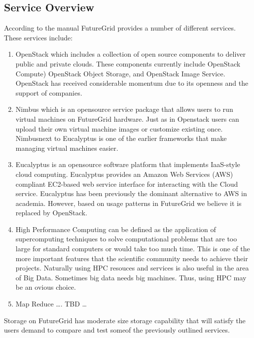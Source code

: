 
\subsection{Service Overview}

According to the manual FutureGrid provides a number of different
services. These services include:

\begin{enumerate}
\item OpenStack which includes a collection of open source components to deliver public and private clouds. These components currently include OpenStack Compute) OpenStack Object Storage, and OpenStack Image Service. OpenStack has received considerable momentum due to its openness and the support of companies. 

\item Nimbus which is an opensource service package that allows users to run virtual machines on FutureGrid hardware. Just as in Openstack users can upload their own virtual machine images or customize existing once. Nimbusnext to Eucalyptus is one of the earlier frameworks that make managing virtual machines easier.

\item Eucalyptus is an opensource software platform that implements IaaS-style cloud computing. Eucalyptus provides an Amazon Web Services (AWS) compliant EC2-based web service interface for interacting with the Cloud service.  Eucalyptus has been previously the dominant alternative to AWS  in academia. However, based on usage patterns in FutureGrid we believe it is replaced by OpenStack.

\item High Performance Computing can be defined as the application of supercomputing techniques to solve computational problems that are too large for standard computers or would take too much time. This is one of the more important features that the scientific community needs to achieve their projects. Naturally using HPC resouces and services is also useful in the area of Big Data. Sometimes big data needs big machines. Thus, using HPC may be an ovious choice.

\item Map Reduce …. TBD …

\end{enumerate}

Storage on FutureGrid has moderate size storage capability that will satisfy the users demand to compare and test someof the previously outlined services.

